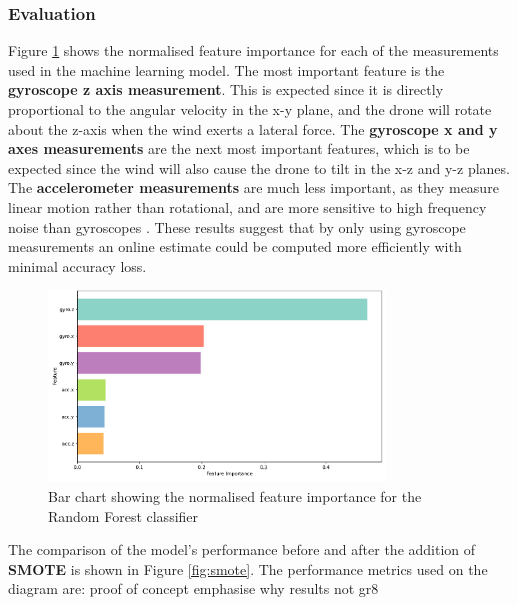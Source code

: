 \subsubsection{Evaluation}

Figure \ref{fig:featureimportance} shows the normalised feature importance for each of the measurements used in the machine learning model. The most important feature is the \textbf{gyroscope z axis measurement}. This is expected since it is directly proportional to the angular velocity in the x-y plane, and the drone will rotate about the z-axis when the wind exerts a lateral force. The \textbf{gyroscope x and y axes measurements} are the next most important features, which is to be expected since the wind will also cause the drone to tilt in the x-z and y-z planes. The \textbf{accelerometer measurements} are much less important, as they measure linear motion rather than rotational, and are more sensitive to high frequency noise than gyroscopes \cite{CASSON2016175}. These results suggest that by only using gyroscope measurements an online estimate could be computed more efficiently with minimal accuracy loss.

\begin{figure}[H]
\centering
\includegraphics[width=0.8\textwidth]{figs/Samuel/Figures/feature_importance_smote (cropped) (pdfresizer.com).pdf}
\caption{Bar chart showing the normalised feature importance for the Random Forest classifier}
\label{fig:featureimportance}
\end{figure}

The comparison of the model's performance before and after the addition of \textbf{SMOTE} is shown in Figure \ref{fig:smote}. The performance metrics used on the diagram are: proof of concept emphasise why results not gr8

